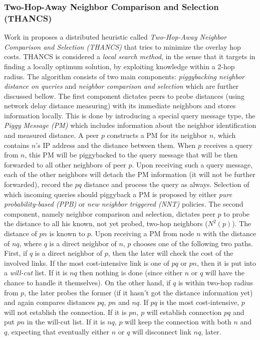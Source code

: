 \subsubsection{Two-Hop-Away Neighbor Comparison and Selection (THANCS)}
Work in \cite{LNXE2005,L2008} proposes a distributed heuristic
called \emph{Two-Hop-Away Neighbor Comparison and Selection (THANCS)} that
tries to minimize the overlay hop costs. THANCS is considered a \emph{local
search method}, in the sense that it targets in finding a locally optimum
solution, by exploiting knowledge within a 2-hop radius. The algorithm consists
of two main components: \emph{piggybacking neighbor distance on queries} and
\emph{neighbor comparison and selection} which are further discussed bellow.
The first component dictates peers to probe distances (using network delay
distance measuring) with its immediate neighbors and stores information
locally. This is done by introducing a special query message type, the
\emph{Piggy Message (PM)} which includes information about the neighbor
identification and measured distance. A peer $p$ constructs a PM for its
neighbor $n$, which contains $n$'s IP address and the distance between them.
When $p$ receives a query from $n$, this PM will be piggybacked to the query
message that will be then forwarded to all other neighbors of peer $p$. Upon
receiving such a query message, each of the other neighbors will detach the PM
information (it will not be further forwarded), record the $pq$ distance and
process the query as always. Selection of which incoming queries should
piggyback a PM is proposed by either \emph{pure probability-based (PPB)} or
\emph{new neighbor triggered (NNT)} policies. The second component, namely
neighbor comparison and selection, dictates peer $p$ to probe the distance to
all his known, not yet probed, two-hop neighbors ($ N^2(p)$). The distance of
$pn$ is known to $p$. Upon receiving a PM from node $n$ with the distance of
$nq$, where $q$ is a direct neighbor of $n$, $p$ chooses one of the following
two paths. First, if $q$ is a direct neighbor of $p$, then the later will check
the cost of the involved links. If the most cost-intensive link is one of $pq$
or $pn$, then it is put into a \emph{will-cut} list. If it is $nq$ then nothing
is done (since either $n$ or $q$ will have the chance to handle it themselves).
On the other hand, if $q$ is within two-hop radius from $p$, the later probes
the former (if it hasn't got the distance information yet) and again compares
distances $pq$, $pn$ and $nq$. If $pq$ is the most cost-intensive, $p$ will not
establish the connection. If it is $pn$, $p$ will establish connection $pq$ and
put $pn$ in the will-cut list. If it is $nq$, $p$ will keep the connection with
both $n$ and $q$, expecting that eventually either $n$ or $q$ will disconnect
link $nq$, later.

